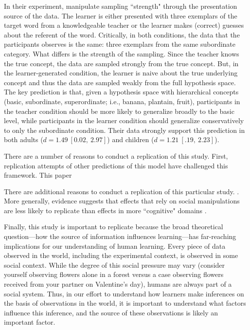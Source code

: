 \documentclass[man]{apa2}
\begin{document}
In their experiment,  manipulate  sampling  ``strength"  through  the presentation source of the data. The learner is either presented with three exemplars of the target word from a knowledgeable teacher or the learner makes (correct) guesses about the referent of the word. Critically, in both conditions, the data that the participants observes is the same:  three exemplars from the same subordinate category. What differs is the strength of the sampling.  Since the teacher  knows the true concept, the data are sampled strongly from the true concept. But, in the learner-generated condition, the learner is naive about the true underlying concept and thus the data are sampled weakly from the full hypothesis space.  The key prediction is that, given a hypothesis space with hierarchical concepts (basic, subordinate, superordinate; i.e., banana, plantain, fruit),  participants in the teacher condition should be more likely to generalize broadly to the basic level, while participants in the learner condition should generalize conservatively to only the subordinate condition. Their data strongly support this prediction in both adults ($d = 1.49\ [0.02,\ 2.97]$) and children  ($d = 1.21\ [.19,\ 2.23]$). %


There are a number of reasons to conduct a replication of this study. First, replication attempts of other predictions of this model have challenged this framework. This paper 
\cite{xu2007a}
\cite{spencer2011}
\cite{jenkins2015non}


There are additional reasons to conduct a replication of this particular study. \cite{navarro2012sampling}. More generally, evidence suggests that effects that rely on social manipulations are less likely to replicate than effects in more ``cognitive" domains \cite{reproProj2015}.

Finally, this study is important to replicate because the broad theoretical question---how the source of information influences learning---has far-reaching implications for our understanding of human learning. Every piece of data observed in the world, including the experimental context,  is observed in some social context. While the degree of this social pressure may vary (consider yourself observing flowers  alone in a forest versus a case observing flowers received from your partner on Valentine's day), humans are always part of a social system. Thus, in our effort to understand how learners make inferences on the basis of observations in the world, it is important to understand what factors influence this inference, and the source of these observations is likely an important factor.
\end{document}

